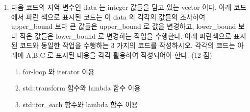 \documentclass{article}
\begin{document}
\begin{enumerate}[itemsep=30pt]
        \item 다음 코드의 지역 변수인 data 는 integer 값들을 담고 있는 vector 이다. 아래 코드에서 파란 색으로 표시된 코드는 이 data 의 각각의 값들의 조사하여 upper\_bound 보다 큰 값들은 upper\_bound 로 값을 변경하고, lower\_bound 보다 작은 값들은 lower\_bound 로 변경하는 작업을 수행한다. 아래 파란색으로 표시된 코드와 동일한 작업을 수행하는 3 가지의 코드를 작성하시오. 각각의 코드는 아래에 A,B,C 로 표시된 내용을 각각 활용하여 작성되어야 한다. (12 점)
              \begin{enumerate}[label={\Alph*.}, itemsep=15pt]
                  \item for-loop 와 iterator 이용 
                  \item std::transform 함수와 lambda 함수 이용 
                  \item std::for\_each 함수와 lambda 함수 이용 
              \end{enumerate}
    \end{enumerate}
\end{document}
